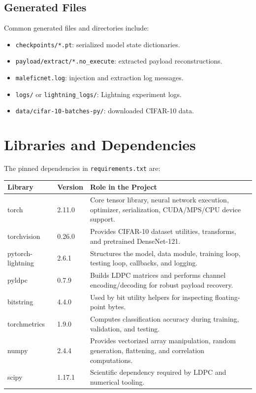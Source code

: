 \documentclass[11pt,a4paper]{article}
\newcommand{\code}[1]{\texttt{#1}}
\begin{document}
\subsection{Generated Files}

Common generated files and directories include:

\begin{itemize}[leftmargin=1.4em]
  \item \code{checkpoints/*.pt}: serialized model state dictionaries.
  \item \code{payload/extract/*.no\_execute}: extracted payload reconstructions.
  \item \code{maleficnet.log}: injection and extraction log messages.
  \item \code{logs/} or \code{lightning\_logs/}: Lightning experiment logs.
  \item \code{data/cifar-10-batches-py/}: downloaded CIFAR-10 data.
\end{itemize}

\section{Libraries and Dependencies}

The pinned dependencies in \code{requirements.txt} are:

\begin{longtable}{>{\ttfamily}p{}p{}p{}}
\textbf{Library} & \textbf{Version} & \textbf{Role in the Project} \\
\hline
\endhead
torch & 2.11.0 & Core tensor library, neural network execution, optimizer, serialization, CUDA/MPS/CPU device support. \\
torchvision & 0.26.0 & Provides CIFAR-10 dataset utilities, transforms, and pretrained DenseNet-121. \\
pytorch-lightning & 2.6.1 & Structures the model, data module, training loop, testing loop, callbacks, and logging. \\
pyldpc & 0.7.9 & Builds LDPC matrices and performs channel encoding/decoding for robust payload recovery. \\
bitstring & 4.4.0 & Used by bit utility helpers for inspecting floating-point bytes. \\
torchmetrics & 1.9.0 & Computes classification accuracy during training, validation, and testing. \\
numpy & 2.4.4 & Provides vectorized array manipulation, random generation, flattening, and correlation computations. \\
scipy & 1.17.1 & Scientific dependency required by LDPC and numerical tooling. \\
\end{longtable}
\end{document}

